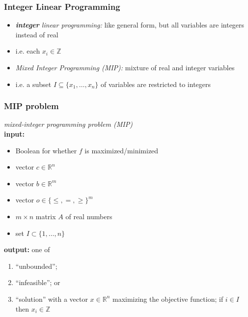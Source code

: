 \documentclass{beamer}
\begin{document}
\begin{frame} \frametitle{Integer Linear Programming}
  \begin{itemize}
  \item \emph{\textbf{integer} linear programming:} like general form, but all variables are integers instead of real
  \item i.e. each $x_i \in \mathbb{Z}$
  \item \emph{Mixed Integer Programming (MIP):} mixture of real and integer variables
  \item i.e. a subset $I \subseteq \{x_1, \ldots, x_n\}$ of variables are restricted to integers
  \end{itemize}
\end{frame}

\begin{frame} \frametitle{MIP problem}
  \emph{mixed-integer programming problem (MIP)} \\
  \textbf{input:}
  \begin{itemize}
    \item Boolean for whether $f$ is maximized/minimized
    \item vector $c \in \mathbb{R}^n$
    \item vector $b \in \mathbb{R}^m$
    \item vector $o \in \{\leq, =, \geq\}^m$
    \item $m \times n$ matrix $A$ of real numbers
    \item set $I \subset \{1, \ldots, n\}$
  \end{itemize}
  \textbf{output:} one of
  \begin{enumerate}
    \item ``unbounded'';
    \item ``infeasible''; or
    \item ``solution'' with a vector $x \in \mathbb{R}^n$
      maximizing the objective function; if $i \in I$ then $x_i \in \mathbb{Z}$
  \end{enumerate}
\end{frame}
\end{document}

